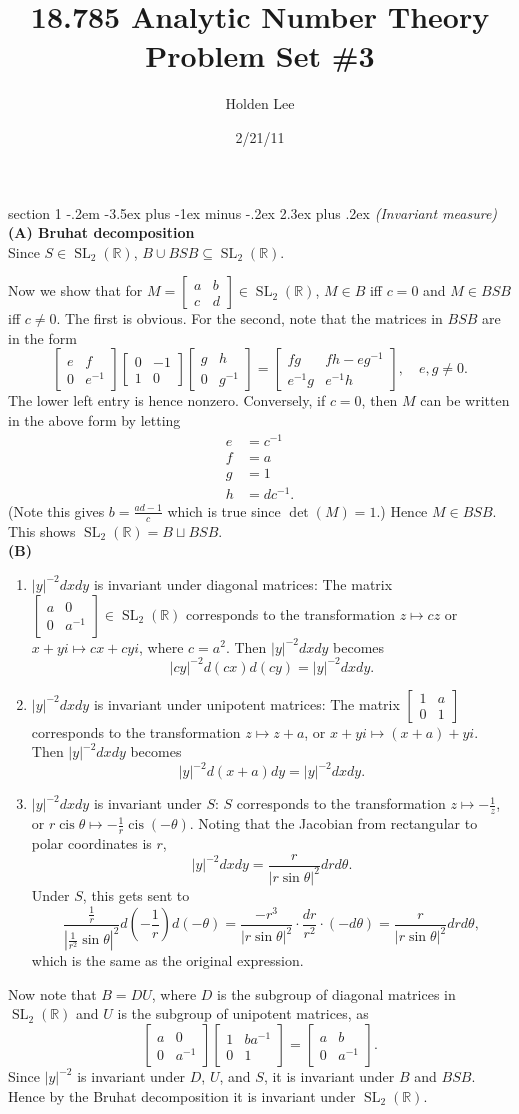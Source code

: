 \documentclass[12pt]{article}
\makeatletter
\theoremstyle{norm}
\newcommand{\R}[0]{\mathbb{R}}
\newcommand{\rc}[1]{\frac{1}{#1}}
\newcommand{\subeq}[0]{\subseteq}
\newcommand{\ab}[1]{\left| {#1} \right|}
\newcommand{\pa}[1]{\left( {#1} \right)}
\newcommand{\subprob}[1]{\noindent\textbf{#1}\\}
\newcommand{\cis}{\operatorname{cis}}
\newcommand{\SL}{\operatorname{SL}}
\newcommand{\matt}[4]{
\left[
\begin{matrix}
{#1}&{#2}\\
{#3}&{#4}
\end{matrix}
\right]}
\newcommand{\smatt}[4]{
\left[
\begin{smallmatrix}
{#1}&{#2}\\
{#3}&{#4}
\end{smallmatrix}
\right]}
\newenvironment{problem}{\@startsection
       {section}
       {1}
       {-.2em}
       {-3.5ex plus -1ex minus -.2ex}
       {2.3ex plus .2ex}
       {\pagebreak[3]%
       \large\bf\noindent{Problem }
       }
       }
       {%
       }
\makeatother
\begin{document}
\title{18.785 Analytic Number Theory Problem Set \#3}%
\author{Holden Lee}
\date{2/21/11}%
\maketitle
\thispagestyle{empty}

\begin{problem}{\it (Invariant measure)}
\subprob{(A) Bruhat decomposition}
Since $S\in \SL_2(\R)$, $B\cup BSB\subeq \SL_2(\R)$.

Now we show that for $M=\smatt abcd\in \SL_2(\R)$, $M\in B$ iff $c= 0$ and $M\in BSB$ iff $c\neq 0$. The first is obvious. For the second, note that the matrices in $BSB$ are in the form
\[
\matt ef0{e^{-1}}\matt 0{-1}10\matt gh0{g^{-1}}
=
\matt {fg}{fh-eg^{-1}}{e^{-1}g}{e^{-1}h},\quad e,g\neq 0.
\]
The lower left entry is hence nonzero. Conversely, if $c=0$, then $M$ can be written in the above form by letting
\begin{align*}
e&=c^{-1}\\
f&=a\\
g&=1\\
h&=dc^{-1}.
\end{align*}
(Note this gives $b=\frac{ad-1}{c}$ which is true since $\det(M)=1$.)
Hence $M\in BSB$. This shows $\SL_2(\R)=B\sqcup BSB$.\\

\subprob{(B)}
\begin{enumerate}
\item $|y|^{-2}dxdy$ is invariant under diagonal matrices: The matrix $\matt a00{a^{-1}}\in \SL_2(\R)$ corresponds to the transformation $z\mapsto c z$ or $x+yi\mapsto cx+cyi$, where $c=a^2$. Then $|y|^{-2}dxdy$ becomes
\[
|cy|^{-2}d(cx)d(cy)=|y|^{-2}dxdy.
\]
\item $|y|^{-2}dxdy$ is invariant under unipotent matrices: The matrix $\matt 1a01$ corresponds to the transformation $z\mapsto z+a$, or $x+yi\mapsto (x+a)+yi$. Then $|y|^{-2}dxdy$ becomes
\[
|y|^{-2}d(x+a)dy=|y|^{-2}dxdy.
\]
\item $|y|^{-2}dxdy$ is invariant under $S$: $S$ corresponds to the transformation $z\mapsto-\rc z$, or $r\cis \theta \mapsto -\rc{r}\cis(-\theta)$. Noting that the Jacobian from rectangular to polar coordinates is $r$,
\[
|y|^{-2}dxdy= \frac{r}{|r\sin\theta|^2}drd\theta.
\]
Under $S$, this gets sent to
\[
\frac{\rc{r}}{\ab{\rc{r^2}\sin\theta}^2}d\pa{-\rc{r}}d(-\theta)
=
\frac{-r^3}{|r\sin\theta|^2}\cdot \frac{dr}{r^2}\cdot (-d\theta)
=
\frac{r}{|r\sin\theta|^2}drd\theta,
\]
which is the same as the original expression.
\end{enumerate}
Now note that $B=DU$, where $D$ is the subgroup of diagonal matrices in $\SL_2(\R)$ and $U$ is the subgroup of unipotent matrices, as
\[
\matt a00{a^{-1}}\matt 1{ba^{-1}}01=\matt ab0{a^{-1}}.
\]
Since $|y|^{-2}$ is invariant under $D$, $U$, and $S$, it is invariant under $B$ and $BSB$. Hence by the Bruhat decomposition it is invariant under $\SL_2(\R)$.
\end{problem}
\end{document}
